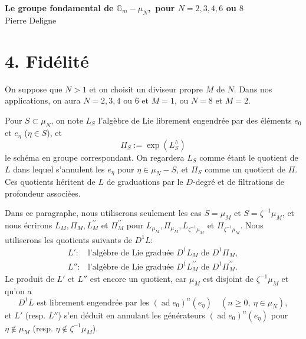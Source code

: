 \documentclass[10pt,a4paper]{article}
\newcommand{\Gm}{\mathbb G_m}
\newcommand{\ad}{\operatorname{ad}}
\theoremstyle{deligne}
\newcommand{\heading}[1]{\vspace{0.65em}\noindent{\bfseries #1}\quad}
\begin{document}
\begin{center}
{\Large\bfseries Le groupe fondamental de \(\Gm-\mu_N\),\ pour \(N=2,3,4,6\) ou \(8\)}\\[0.4em]
{\large Pierre Deligne}
\end{center}

\section*{4. Fidélité}

On suppose que \(N>1\) et on choisit un diviseur propre \(M\) de \(N\). Dans nos applications, on aura \(N=2,3,4\) ou \(6\) et \(M=1\), ou \(N=8\) et \(M=2\).

\heading{4.1.} Pour \(S\subset \mu_N\), on note \(L_S\) l'algèbre de Lie librement engendrée par des éléments \(e_0\) et \(e_\eta\) (\(\eta\in S\)), et
\[
\Pi_S:=\exp(L_S^{\wedge})
\]
le schéma en groupe correspondant. On regardera \(L_S\) comme étant le quotient de \(L\) dans lequel s'annulent les \(e_\eta\) pour \(\eta\in\mu_N-S\), et \(\Pi_S\) comme un quotient de \(\Pi\). Ces quotients héritent de \(L\) de graduations par le \(D\)-degré et de filtrations de profondeur associées.

Dans ce paragraphe, nous utiliserons seulement les cas \(S=\mu_M\) et \(S=\zeta^{-1}\mu_M\), et nous écrirons \(L_M,\Pi_M,L_M^{\prime\prime}\) et \(\Pi_M^{\prime\prime}\) pour \(L_{\mu_M},\Pi_{\mu_M},L_{\zeta^{-1}\mu_M}\) et \(\Pi_{\zeta^{-1}\mu_M}\). Nous utiliserons les quotients suivants de \(D^1L\):
\[
\begin{array}{ll}
L': & \text{l'algèbre de Lie graduée }D^1L_M\text{ de }D^1\Pi_M,\\
L'':& \text{l'algèbre de Lie graduée }D^1L_M^{\prime\prime}\text{ de }D^1\Pi_M^{\prime\prime}.
\end{array}
\]
Le produit de \(L'\) et \(L''\) est encore un quotient, car \(\mu_M\) est disjoint de \(\zeta^{-1}\mu_M\) et qu'on a
\[
\tag{4.1.1}
D^1L\text{ est librement engendrée par les }(\ad e_0)^n(e_\eta)\quad(n\ge0,\ \eta\in\mu_N),
\]
et \(L'\) (resp. \(L''\)) s'en déduit en annulant les générateurs \((\ad e_0)^n(e_\eta)\) pour \(\eta\notin\mu_M\) (resp. \(\eta\notin\zeta^{-1}\mu_M\)).
\end{document}
